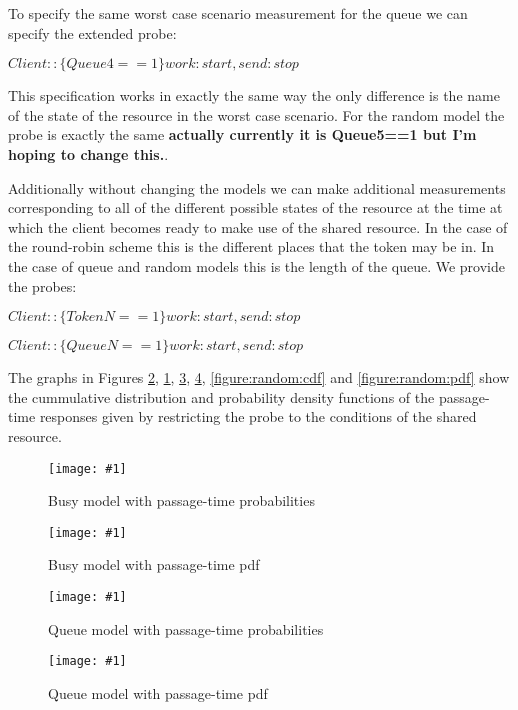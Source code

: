 \documentclass[times, 10pt,twocolumn]{article}
\newcommand{\adcComment}[1]{\textbf{#1}}
\newcommand{\graphicfigure}[3]{
\begin{figure}
\texttt{[image: \#1]}
\caption{
\label{#2}
#3
}
\end{figure}
}
\newcommand{\showprobe}[1]{$#1$}
\begin{document}
To specify the same worst case scenario measurement for the queue
we can specify the extended probe:

\showprobe{ Client:: \{Queue4 == 1\}work:start, send:stop }

\noindent
This specification works in exactly the same way the only difference
is the name of the state of the resource in the worst case scenario.
For the random model the probe is exactly the same
\adcComment{actually currently it is Queue5==1 but I'm hoping to change this.}.

Additionally without changing the models we can make additional measurements
corresponding to all of the different possible states of the resource at the
time at which the client becomes ready to make use of the shared resource.
In the case of the round-robin scheme this is the different places that the
token may be in. In the case of queue and random models this is the length
of the queue.
We provide the probes:

\showprobe{ Client:: \{TokenN == 1\}work:start, send:stop }

\showprobe{ Client:: \{QueueN == 1\}work:start, send:stop }

\noindent
The graphs in Figures
\ref{figure:robin:cdf},
\ref{figure:robin:pdf},
\ref{figure:queue:cdf},
\ref{figure:queue:pdf},
\ref{figure:random:cdf} and
\ref{figure:random:pdf}
show the cummulative distribution and probability density functions
of the passage-time responses given by restricting the probe to the
conditions of the shared resource.


\graphicfigure{busy_cdf.pdf}
              {figure:robin:pdf}
              {Busy model with passage-time probabilities}

\graphicfigure{busy_pdf.pdf}
              {figure:robin:cdf}
              {Busy model with passage-time pdf}

% 

\graphicfigure{queue_cdf.pdf}
              {figure:queue:cdf}
              {Queue model with passage-time probabilities}

\graphicfigure{queue_pdf.pdf}
              {figure:queue:pdf}
              {Queue model with passage-time pdf}
\end{document}
